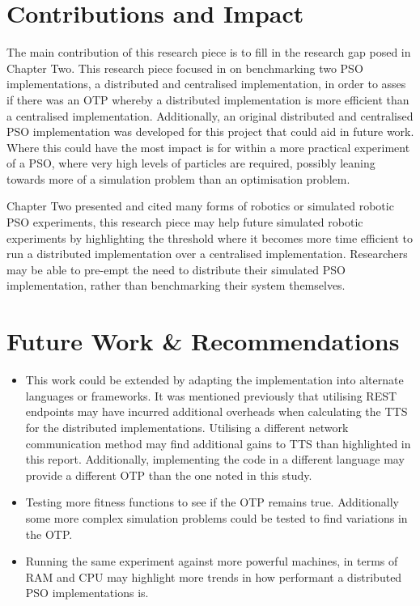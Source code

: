 \documentclass[oneside,12pt]{book}
\begin{document}
\section{Contributions and Impact}
The main contribution of this research piece is to fill in the research gap posed in Chapter Two. This research piece focused in on benchmarking two PSO implementations, a distributed and centralised implementation, in order to asses if there was an OTP whereby a distributed implementation is more efficient than a centralised implementation. Additionally, an original distributed and centralised PSO implementation was developed for this project that could aid in future work. Where this could have the most impact is for within a more practical experiment of a PSO, where very high levels of particles are required, possibly leaning towards more of a simulation problem than an optimisation problem.

Chapter Two presented and cited many forms of robotics or simulated robotic PSO experiments, this research piece may help future simulated robotic experiments by highlighting the threshold where it becomes more time efficient to run a distributed implementation over a centralised implementation. Researchers may be able to pre-empt the need to distribute their simulated PSO implementation, rather than benchmarking their system themselves. 

\section{Future Work \& Recommendations}
\begin{itemize}
\item This work could be extended by adapting the implementation into alternate languages or frameworks. It was mentioned previously that utilising REST endpoints may have incurred additional overheads when calculating the TTS for the distributed implementations. Utilising a different network communication method may find additional gains to TTS than highlighted in this report. Additionally, implementing the code in a different language may provide a different OTP than the one noted in this study.
\item Testing more fitness functions to see if the OTP remains true. Additionally some more complex simulation problems could be tested to find variations in the OTP.
\item Running the same experiment against more powerful machines, in terms of RAM and CPU may highlight more trends in how performant a distributed PSO implementations is. 
\end{itemize}
\end{document}
